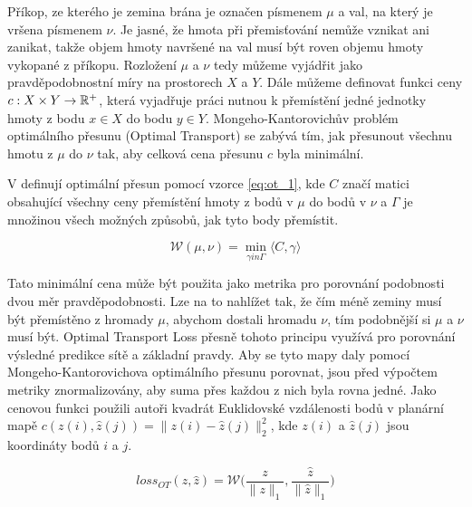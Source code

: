 Příkop, ze kterého je zemina brána je označen písmenem \(\mu\) a val, na který je vršena písmenem \(\nu\).
Je jasné, že hmota při přemisťování nemůže vznikat ani zanikat, takže objem hmoty navršené na val musí být roven objemu hmoty vykopané z příkopu. 
Rozložení \(\mu\) a \(\nu\) tedy můžeme vyjádřit jako pravděpodobnostní míry na prostorech \(X\) a \(Y\).
Dále můžeme definovat funkci ceny \(c : X \times Y  \rightarrow \mathbb{R}^+ \), která vyjadřuje práci nutnou k přemístění jedné jednotky hmoty z bodu \(x \in X\) do bodu \(y \in Y\).
Mongeho-Kantorovichův problém optimálního přesunu (Optimal Transport) se zabývá tím, jak přesunout všechnu hmotu z \(\mu\) do \(\nu\) tak, aby celková cena přesunu \(c\) byla minimální.

V \cite{DM_Count} definují optimální přesun pomocí vzorce \ref{eq:ot_1}, kde \(C\) značí matici obsahující všechny ceny přemístění hmoty z bodů v \(\mu\)  do bodů v \(\nu\) a \(\Gamma\) je množinou všech možných způsobů, jak tyto body přemístit.

\begin{equation}
\mathcal{W}(\mu, \nu) = \min_{\gamma in \Gamma} \langle C, \gamma \rangle
\label{eq:ot_1}
\end{equation}

Tato minimální cena může být použita jako metrika pro porovnání podobnosti dvou měr pravděpodobnosti.
Lze na to nahlížet tak, že čím méně zeminy musí být přemístěno z hromady \(\mu\), abychom dostali hromadu \(\nu\), tím podobnější si \(\mu\) a \(\nu\) musí být.
Optimal Transport Loss přesně tohoto principu využívá pro porovnání výsledné predikce sítě a 
základní pravdy.
Aby se tyto mapy daly pomocí Mongeho-Kantorovichova optimálního přesunu porovnat, jsou před výpočtem metriky znormalizovány, aby suma přes každou z nich byla rovna jedné.
Jako cenovou funkci použili autoři \cite{DM_Count} kvadrát Euklidovské vzdálenosti bodů v planární mapě \(c(z(i), \hat{z}(j)) = \|z(i) - \hat{z}(j)\|_2^2\), kde \(z(i)\) a \(\hat{z}(j)\) jsou koordináty bodů \(i\) a \(j\).

\begin{equation}
loss_{OT}(z, \hat{z}) = \mathcal{W}\bigg(\frac{z}{\|z\|_1}, \frac{\hat{z}}{\|\hat{z}\|_1}\bigg) 
\label{eq:ot_loss}
\end{equation}

